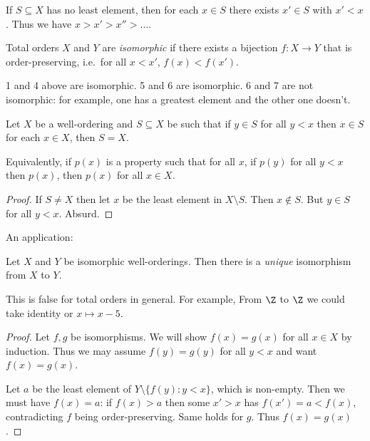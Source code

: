 \documentclass[a4paper]{article}
\begin{document}
\begin{corollary}
  If \(S \subseteq X\) has no least element, then for each \(x \in S\) there exists \(x' \in S\) with \(x' < x\). Thus we have \(x > x' > x'' > \dots\).
\end{corollary}

\begin{definition}
  Total orders \(X\) and \(Y\) are \emph{isomorphic} if there exists a bijection \(f: X \to Y\) that is order-preserving, i.e.\ for all \(x < x'\), \(f(x) < f(x')\).
\end{definition}

\begin{eg}
  1 and 4 above are isomorphic. 5 and 6 are isomorphic. 6 and 7 are not isomorphic: for example, one has a greatest element and the other one doesn't.
\end{eg}

\begin{proposition}
  Let \(X\) be a well-ordering and \(S \subseteq X\) be such that if \(y \in S\) for all \(y < x\) then \(x \in S\) for each \(x \in X\), then \(S = X\).

  Equivalently, if \(p(x)\) is a property such that for all \(x\), if \(p(y)\) for all \(y < x\) then \(p(x)\), then \(p(x)\) for all \(x \in X\).
\end{proposition}

\begin{proof}
  If \(S \neq X\) then let \(x\) be the least element in \(X \setminus S\). Then \(x \notin S\). But \(y \in S\) for all \(y < x\). Absurd.
\end{proof}

An application:

\begin{proposition}
  Let \(X\) and \(Y\) be isomorphic well-orderings. Then there is a \emph{unique} isomorphism from \(X\) to \(Y\).
\end{proposition}

\begin{remark}
  This is false for total orders in general. For example, From \(\Z\) to \(\Z\) we could take identity or \(x \mapsto x - 5\).
\end{remark}

\begin{proof}
  Let \(f, g\) be isomorphisms. We will show \(f(x) = g(x)\) for all \(x \in X\) by induction. Thus we may assume \(f(y) = g(y)\) for all \(y < x\) and want \(f(x) = g(x)\).

  Let \(a\) be the least element of \(Y \setminus \{f(y): y < x\}\), which is non-empty. Then we must have \(f(x) = a\): if \(f(x) > a\) then some \(x' > x\) has \(f(x') = a < f(x)\), contradicting \(f\) being order-preserving. Same holds for \(g\). Thus \(f(x) = g(x)\).
\end{proof}
\end{document}
